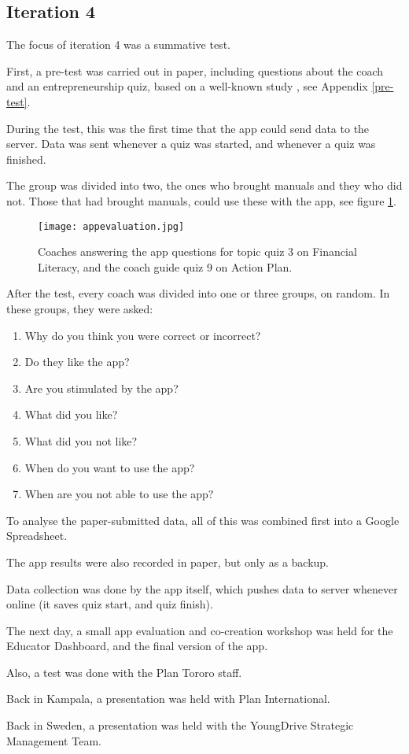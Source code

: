 \subsection{Iteration 4}

The focus of iteration 4 was a summative test.

First, a pre-test was carried out in paper, including questions about the coach and an entrepreneurship quiz, based on a well-known study \citep{general-entrepreneurship-quiz}, see Appendix \ref{pre-test}.

During the test, this was the first time that the app could send data to the server. Data was sent whenever a quiz was started, and whenever a quiz was finished.

The group was divided into two, the ones who brought manuals and they who did not. Those that had brought manuals, could use these with the app, see figure \ref{fig:appevaluation}.

\begin{figure}[h]
    \centering
    \texttt{[image: appevaluation.jpg]}
    \caption{Coaches answering the app questions for topic quiz 3 on Financial Literacy, and the coach guide quiz 9 on Action Plan.}
    \label{fig:appevaluation}
\end{figure}

After the test, every coach was divided into one or three groups, on random. In these groups, they were asked:

\begin{enumerate}
\item Why do you think you were correct or incorrect?
\item Do they like the app?
\item Are you stimulated by the app?
\item What did you like?
\item What did you not like?
\item When do you want to use the app?
\item When are you not able to use the app?
\end{enumerate}

To analyse the paper-submitted data, all of this was combined first into a Google Spreadsheet.

The app results were also recorded in paper, but only as a backup.

Data collection was done by the app itself, which pushes data to server whenever online (it saves quiz start, and quiz finish).

The next day, a small app evaluation and co-creation workshop was held for the Educator Dashboard, and the final version of the app.

Also, a test was done with the Plan Tororo staff.

Back in Kampala, a presentation was held with Plan International.

Back in Sweden, a presentation was held with the YoungDrive Strategic Management Team.
